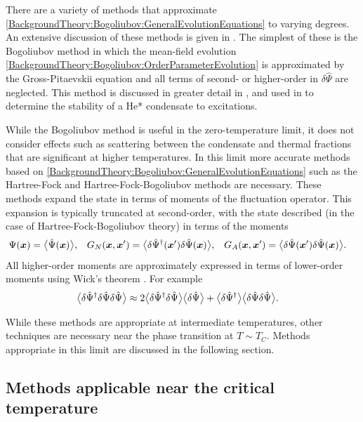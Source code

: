There are a variety of methods that approximate \eqref{BackgroundTheory:Bogoliubov:GeneralEvolutionEquations} to varying degrees.  An extensive discussion of these methods is given in \citep{Proukakis:2008}.  The simplest of these is the Bogoliubov method in which the mean-field evolution \eqref{BackgroundTheory:Bogoliubov:OrderParameterEvolution} is approximated by the Gross-Pitaevskii equation and all terms of second- or higher-order in $\delta\hat{\Psi}$ are neglected.  This method is discussed in greater detail in , and used in  to determine the stability of a He* condensate to excitations.

While the Bogoliubov method is useful in the zero-temperature limit, it does not consider effects such as scattering between the condensate and thermal fractions that are significant at higher temperatures.  In this limit more accurate methods based on \eqref{BackgroundTheory:Bogoliubov:GeneralEvolutionEquations} such as the Hartree-Fock and Hartree-Fock-Bogoliubov methods are necessary.  These methods expand the state in terms of moments of the fluctuation operator.  This expansion is typically truncated at second-order, with the state described (in the case of Hartree-Fock-Bogoliubov theory) in terms of the moments
\begin{align*}
    \Psi(\bm{x}) &= {\big<\hat{\Psi}(\bm{x})\big>}, & G_N(\bm{x}, \bm{x}') &= {\big<\delta\hat{\Psi}^\dagger(\bm{x}') \delta\hat{\Psi}(\bm{x})\big>}, & G_A(\bm{x}, \bm{x}') &= {\big<\delta\hat{\Psi}(\bm{x}') \delta\hat{\Psi}(\bm{x})\big>}.
\end{align*}
All higher-order moments are approximately expressed in terms of lower-order moments using Wick's theorem \citep{Wick:1950,Blaizot:1986}.  For example
\begin{align}
    {\ensuremath{\big<\delta\hat{\Psi}^\dagger \delta\hat{\Psi} \delta\hat{\Psi}\big>}} &\approx 2 {\big<\delta\hat{\Psi}^\dagger \delta\hat{\Psi}\big>} {\big<\delta\hat{\Psi}\big>} + {\big<\delta\hat{\Psi}^\dagger\big>} {\big<\delta\hat{\Psi} \delta\hat{\Psi}\big>}.
\end{align}

While these methods are appropriate at intermediate temperatures, other techniques are necessary near the phase transition at $T\sim T_C$.  Methods appropriate in this limit are discussed in the following section.

\subsection{Methods applicable near the critical temperature}

